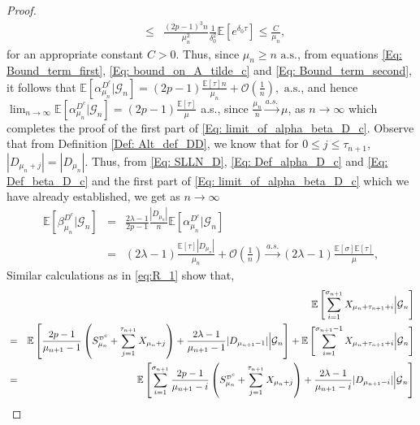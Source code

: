 \documentclass{article}
\numberwithin{equation}{section}
\newcommand{\GG}{\mbox{${\mathcal G}$}}
\newcommand{\sDD}{\tiny{\mbox{${\mathcal D}$}}}
\newcommand{\1}{\mathbf{1}}
\newcommand{\0}{\mathbf{0}}
\newcommand{\E}{\mbox{${\mathbb E}$}}
\begin{document}
\begin{proof}
\begin{eqnarray}
    &\leq& \frac{(2p-1)^3n}{\mu_n^2}\frac{1}{\delta_0^2} \E[e^{\delta_0\tau}] \le  \frac{C}{\mu_n}, 
\end{eqnarray}
for an appropriate constant $C>0$.
Thus, since $\mu_n \ge n \text{ a.s.}$, from equations \eqref{Eq: Bound_term_first}, \eqref{Eq: bound_on_A_tilde_c} and \eqref{Eq: Bound_term_second}, it follows that $\E[\alpha_{\mu_n}^{D^c} \vert \GG_n]=(2p-1)\frac{\E[\tau]n}{\mu_n} + \mathcal{O}\left(\frac{1}{n}\right), \text{ a.s.}$, and hence $\lim_{n \to \infty}\E[\alpha_{\mu_n}^{D^c} \vert \GG_n] = (2p-1)\frac{\E[\tau]}{\mu}$ a.s., since $\frac{\mu_n}{n} \stackrel{a.s.}{\longrightarrow} \mu$, as $n \to \infty$ which completes the proof of the first part of \eqref{Eq: limit_of_alpha_beta_D_c}.
Observe that from Definition \ref{Def: Alt_def_DD}, we know that for $0 \leq j \leq \tau_{n+1}$, $|D_{\mu_n+j}| = |D_{\mu_n}|$. Thus, from \eqref{Eq: SLLN_D}, \eqref{Eq: Def_alpha_D_c} and \eqref{Eq: Def_beta_D_c} and the first part of \eqref{Eq: limit_of_alpha_beta_D_c} which we have already established, we get as $n \to \infty$
\begin{eqnarray}
\label{Eq: Beta_D_c_calc}
     \E[\beta_{\mu_n}^{D^c} \vert \GG_n]
     &=& \frac{2\lambda-1}{2p-1}\frac{|D_{\mu_n}|}{n} \E[\alpha_{\mu_n}^{D^c} \vert \GG_n]\nonumber \\
     &=& (2\lambda -1) \frac{\E[\tau]|D_{\mu_n}|}{\mu_n} + \mathcal{O}\left(\frac{1}{n}\right) \stackrel{a.s.}{\longrightarrow} (2\lambda -1) \frac{\E \left[\sigma \right] \E[\tau]}{\mu},
\end{eqnarray}
Similar calculations as in  \eqref{eq:R_1} show that,
\begin{eqnarray*}
   & & \E\left[ \sum\limits_{i=1}^{\sigma_{n+1}} X_{\mu_{n} + \tau_{n+1} + i} \Big \vert \GG_n \right] \\ 
     &=& \E \left[\frac{2p-1}{\mu_{n+1}-1}\left(S_{\mu_n}^{\sDD^c} + \sum\limits_{j=1}^{\tau_{n+1}} X_{\mu_{n} + j}\right)+ \frac{2\lambda-1}{\mu_{n+1}-1}|D_{\mu_{n+1}-1}| \Big \vert \GG_n \right] 
     + \E\left[ \sum\limits_{i=1}^{\sigma_{n+1}-1} X_{\mu_{n} + \tau_{n+1} + i} \Big \vert  \GG_{n} \right] \nonumber \\
    \nonumber &=& \E \left[ \sum_{i=1}^{\sigma_{n+1}} \frac{2p-1}{\mu_{n+1}-i}\left(S_{\mu_n}^{\sDD^c} +  \sum\limits_{j=1}^{\tau_{n+1}} X_{\mu_{n} + j}  \right) + \frac{2\lambda-1}{\mu_{n+1}-i}|D_{\mu_{n+1}-i}| \Big \vert \GG_{n} \right]\\

\end{eqnarray*}
\end{proof}
\end{document}
